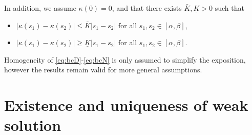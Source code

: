 In addition, we assume $\kappa(0) = 0$, and that there exists $\bar{K},\underline{K}>0$ such that 
\begin{itemize}
\item 
$|\kappa(s_1) - \kappa(s_2)| \leq \bar{K} |s_1-s_2|$ for all $s_1,s_2 \in [\alpha, \beta]$, %
 \item %
 $|\kappa(s_1) - \kappa(s_2) | \geq \underline{K} |s_1-s_2|$ for all $s_1,s_2\in [\alpha, \beta]$. 
 \end{itemize}
 Homogeneity of \eqref{eq:bcD}-\eqref{eq:bcN} is only assumed to simplify the exposition, however the results remain valid for more general assumptions. %
%
\section{Existence and uniqueness of weak solution}\label{sec:weak}
